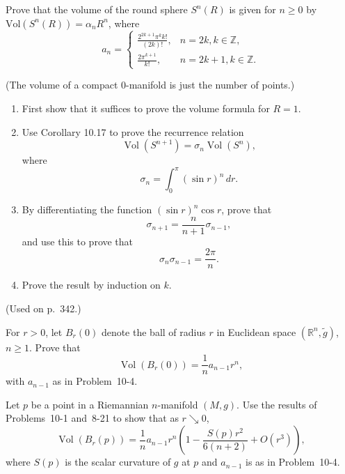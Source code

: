 \begin{exercise}
\label{prob:volume-formula-spheres}

Prove that the volume of the round sphere $S^n(R)$ is given for $n \ge 0$ by $\text{Vol}(S^n(R)) = \alpha_n R^n$, where
\[
a_n = \begin{cases}
\frac{2^{2k+1} \pi^k k!}{(2k)!}, & n = 2k, k \in \mathbb{Z}, \\
\frac{2\pi^{k+1}}{k!}, & n = 2k+1, k \in \mathbb{Z}.
\end{cases}
\]

(The volume of a compact 0-manifold is just the number of points.)

\begin{enumerate}
\item[(a)] First show that it suffices to prove the volume formula for $R = 1$.
\item[(b)] Use Corollary 10.17 to prove the recurrence relation
\[
\operatorname{Vol}(S^{n+1}) = \sigma_n \operatorname{Vol}(S^n),
\]
where
\[
\sigma_n = \int_0^{\pi} (\sin r)^n \, dr.
\]
\item[(c)] By differentiating the function $(\sin r)^n \cos r$, prove that
\[
\sigma_{n+1} = \frac{n}{n+1} \sigma_{n-1},
\]
and use this to prove that
\[
\sigma_n \sigma_{n-1} = \frac{2\pi}{n}.
\]
\item[(d)] Prove the result by induction on $k$.
\end{enumerate}

(Used on p.~342.)
\end{exercise}

\begin{exercise}
\label{prob:volume-euclidean-balls}

For $r > 0$, let $B_r(0)$ denote the ball of radius $r$ in Euclidean space $(\mathbb{R}^n, \tilde{g})$, $n \geq 1$. Prove that
\[
\operatorname{Vol}(B_r(0)) = \frac{1}{n} a_{n-1} r^n,
\]
with $a_{n-1}$ as in Problem~10-4.
\end{exercise}

\begin{exercise}
\label{prob:asymptotic-volume-geodesic-balls}

Let $p$ be a point in a Riemannian $n$-manifold $(M,g)$. Use the results of Problems~10-1 and~8-21 to show that as $r \searrow 0$,
\[
\operatorname{Vol}(B_r(p)) = \frac{1}{n} a_{n-1} r^n \left( 1 - \frac{S(p) r^2}{6(n+2)} + O(r^3) \right),
\]
where $S(p)$ is the scalar curvature of $g$ at $p$ and $a_{n-1}$ is as in Problem~10-4.
\end{exercise}

